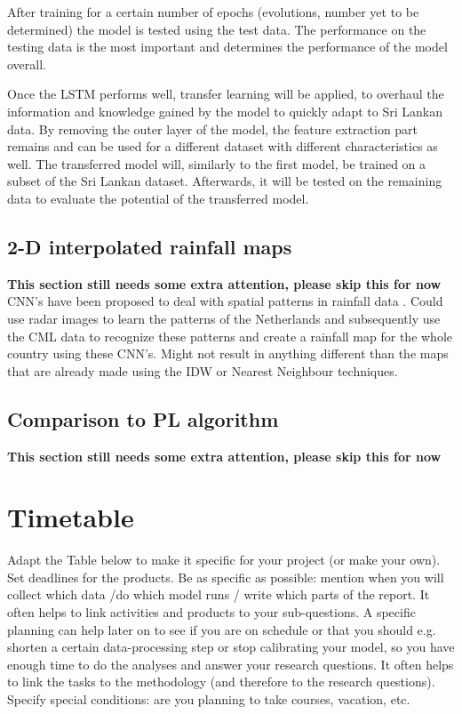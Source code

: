 \documentclass[twocolumn, 10pt, a4paper]{article}
\begin{document}
	After training for a certain number of epochs (evolutions, number yet to be determined) the model is tested using the test data. The performance on the testing data is the most important and determines the performance of the model overall. 
	
	Once the LSTM performs well, transfer learning will be applied, to overhaul the information and knowledge gained by the model to quickly adapt to Sri Lankan data. By removing the outer layer of the model, the feature extraction part remains and can be used for a different dataset with different characteristics as well. The transferred model will, similarly to the first model, be trained on a subset of the Sri Lankan dataset. Afterwards, it will be tested on the remaining data to evaluate the potential of the transferred model. 
	
	\subsection{2-D interpolated rainfall maps}
	\textbf{This section still needs some extra attention, please skip this for now}
	CNN's have been proposed to deal with spatial patterns in rainfall data \cite{Sadeghi2019}. Could use radar images to learn the patterns of the Netherlands and subsequently use the CML data to recognize these patterns and create a rainfall map for the whole country using these CNN's. Might not result in anything different than the maps that are already made using the IDW or Nearest Neighbour techniques. 
	
	\subsection{Comparison to PL algorithm}
	\textbf{This section still needs some extra attention, please skip this for now}	
	
	\section{Timetable}
	
	Adapt the Table below to make it specific for your project (or make your own). Set deadlines for the products. Be as specific as possible: mention when you will collect which data /do which model runs / write which parts of the report. It often helps to link activities and products to your sub-questions. A specific planning can help later on to see if you are on schedule or that you should e.g. shorten a certain data-processing step or stop calibrating your model, so you have enough time to do the analyses and answer your research questions. It often helps to link the tasks to the methodology (and therefore to the research questions). Specify special conditions: are you planning to take courses, vacation, etc. 
	
\end{document}

